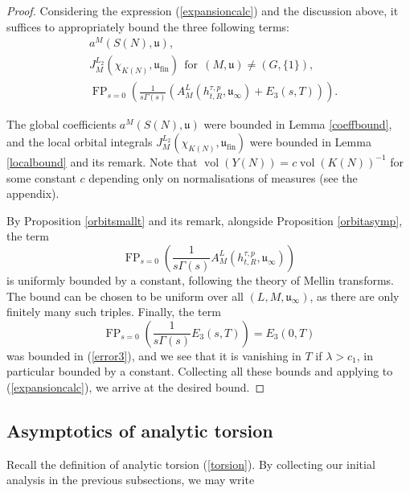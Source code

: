 \documentclass[11pt,reqno]{amsart}
\numberwithin{equation}{section}
\theoremstyle{definition}
\theoremstyle{remark}
\newcommand{\vol}{\operatorname{vol}}
\newcommand{\FP}{\operatorname{FP}}
\newcommand{\mf}[1]{\mathfrak{#1}}
\begin{document}
\begin{proof}
    Considering the expression (\ref{expansioncalc}) and the discussion above, it suffices to appropriately bound the three following terms:
    \begin{align*}
        &a^M(S(N),\mf{u}), \\
        & J_M^{L_2}(\chi_{K(N)},\mf{u}_{\text{fin}}) \:\: \text{for} \:\:(M,\mf{u})\neq (G,\lbrace1\rbrace), \\
        &\FP_{s=0}\left(\frac{1}{s\Gamma(s)}\left(A_M^{L}(h^{\tau,p}_{t,R},\mf{u}_\infty)+E_3(s,T)\right)\right).
    \end{align*}

    \noindent The global coefficients $a^M(S(N),\mf{u})$ were bounded in Lemma \ref{coeffbound}, and the local orbital integrals $J_M^{L_2}(\chi_{K(N)},\mf{u}_{\text{fin}})$ were bounded in Lemma \ref{localbound} and its remark. Note that $\vol(Y(N))=c\vol(K(N))^{-1}$ for some constant $c$ depending only on normalisations of measures (see the appendix).

    By Proposition \ref{orbitsmallt} and its remark, alongside Proposition \ref{orbitasymp}, the term 
    $$\FP_{s=0}\left(\frac{1}{s\Gamma(s)}A_M^{L}(h^{\tau,p}_{t,R},\mf{u}_\infty)\right)$$
    is uniformly bounded by a constant, following the theory of Mellin transforms. The bound can be chosen to be uniform over all $(L,M,\mf{u}_\infty)$, as there are only finitely many such triples. Finally, the term
    $$\FP_{s=0}\left(\frac{1}{s\Gamma(s)}E_3(s,T)\right) = E_3(0,T)$$ 
    was bounded in (\ref{error3}), and we see that it is vanishing in $T$ if $\lambda >c_1$, in particular bounded by a constant. Collecting all these bounds and applying to (\ref{expansioncalc}), we arrive at the desired bound. 
\end{proof}

\subsection*{Asymptotics of analytic torsion}

Recall the definition of analytic torsion (\ref{torsion}). By collecting our initial analysis in the previous subsections, we may write
\end{document}
